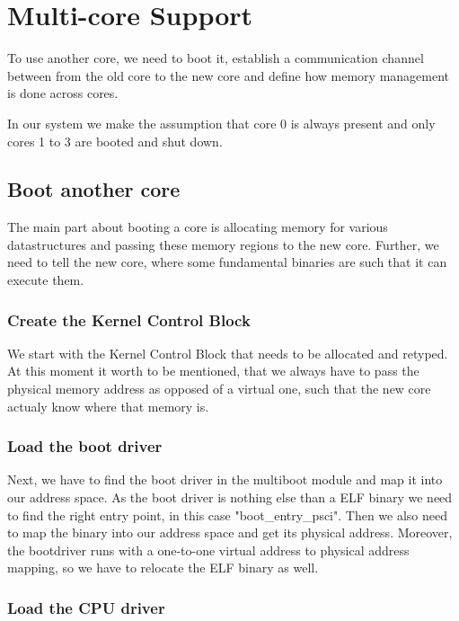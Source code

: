 \chapter{Multi-core Support}

To use another core, we need to boot it, establish a communication channel
between from the old core to the new core and define how memory management is
done across cores.

In our system we make the assumption that core 0 is always present and only
cores 1 to 3 are booted and shut down.

\section{Boot another core}

The main part about booting a core is allocating memory for various
datastructures and passing these memory regions to the new core. Further, we
need to tell the new core, where some fundamental binaries are such that it can
execute them.

\subsection{Create the Kernel Control Block}

We start with the Kernel Control Block that needs to be allocated and retyped.
At this moment it worth to be mentioned, that we always have to pass the
physical memory address as opposed of a virtual one, such that the new core
actualy know where that memory is. 

\subsection{Load the boot driver}

Next, we have to find the boot driver in the multiboot module and map it into
our address space. As the boot driver is nothing else than a ELF binary we need
to find the right entry point, in this case "boot\_entry\_psci". Then we also
need to map the binary into our address space and get its physical address.
Moreover, the bootdriver runs with a one-to-one virtual address to physical
address mapping, so we have to relocate the ELF binary as well.


\subsection{Load the CPU driver}

